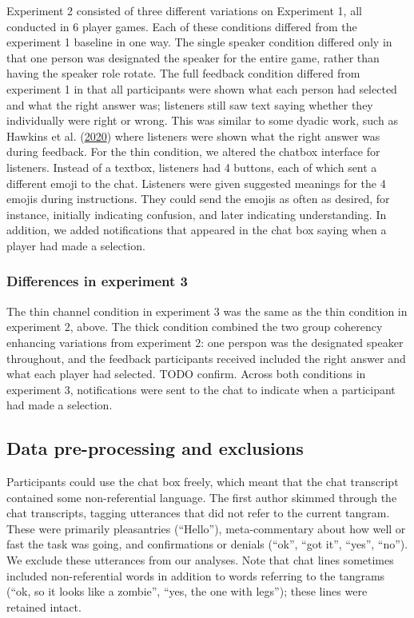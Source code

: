 \documentclass[
  english,
  a4paper,
]{article}
\begin{document}
Experiment 2 consisted of three different variations on Experiment 1, all conducted in 6 player games. Each of these conditions differed from the experiment 1 baseline in one way. The single speaker condition differed only in that one person was designated the speaker for the entire game, rather than having the speaker role rotate. The full feedback condition differed from experiment 1 in that all participants were shown what each person had selected and what the right answer was; listeners still saw text saying whether they individually were right or wrong. This was similar to some dyadic work, such as Hawkins et al. (\protect\hyperlink{ref-hawkinsCharacterizingDynamicsLearning2020}{2020}) where listeners were shown what the right answer was during feedback. For the thin condition, we altered the chatbox interface for listeners. Instead of a textbox, listeners had 4 buttons, each of which sent a different emoji to the chat. Listeners were given suggested meanings for the 4 emojis during instructions. They could send the emojis as often as desired, for instance, initially indicating confusion, and later indicating understanding. In addition, we added notifications that appeared in the chat box saying when a player had made a selection.

\hypertarget{differences-in-experiment-3}{%
\subsubsection{Differences in experiment 3}\label{differences-in-experiment-3}}

The thin channel condition in experiment 3 was the same as the thin condition in experiment 2, above. The thick condition combined the two group coherency enhancing variations from experiment 2: one perspon was the designated speaker throughout, and the feedback participants received included the right answer and what each player had selected. TODO confirm. Across both conditions in experiment 3, notifications were sent to the chat to indicate when a participant had made a selection.

\hypertarget{data-pre-processing-and-exclusions}{%
\subsection{Data pre-processing and exclusions}\label{data-pre-processing-and-exclusions}}

Participants could use the chat box freely, which meant that the chat transcript contained some non-referential language. The first author skimmed through the chat transcripts, tagging utterances that did not refer to the current tangram. These were primarily pleasantries (``Hello''), meta-commentary about how well or fast the task was going, and confirmations or denials (``ok'', ``got it'', ``yes'', ``no''). We exclude these utterances from our analyses. Note that chat lines sometimes included non-referential words in addition to words referring to the tangrams (``ok, so it looks like a zombie'', ``yes, the one with legs''); these lines were retained intact.
\end{document}

